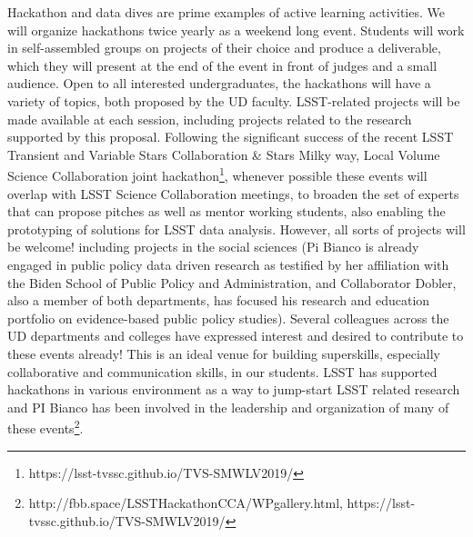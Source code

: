 Hackathon and data dives are prime examples of active learning activities.  We will organize hackathons twice yearly as a weekend long event.  Students will work in self-assembled groups on projects of their choice and produce a deliverable, which they will present at the end of the event in front of judges and a small audience.  Open to all interested undergraduates, the hackathons will have a variety of topics, both proposed by the UD faculty. LSST-related projects will be made available at each session, including projects related to the research supported by this proposal. Following the significant success of the recent LSST Transient and Variable Stars Collaboration & Stars Milky way, Local Volume Science Collaboration joint hackathon\footnote{https://lsst-tvssc.github.io/TVS-SMWLV2019/}, whenever possible these events will overlap with LSST Science Collaboration meetings, to broaden the set of experts that can propose pitches as well as mentor working students, also enabling the prototyping of solutions for LSST data analysis. However, all sorts of projects will be welcome! including projects in the social sciences (Pi Bianco is already engaged in public policy data driven research as testified by her affiliation with the Biden School of Public Policy and Administration, and Collaborator Dobler, also a member of both departments, has focused his research and education portfolio on evidence-based public policy studies).  Several colleagues across the UD departments and colleges have expressed interest and desired to contribute to these events already! This is an ideal venue for building superskills, especially collaborative and communication skills, in our students. LSST has supported hackathons in various environment as a way to jump-start LSST related research and PI Bianco has been involved in the leadership and organization of many of these events\footnote{http://fbb.space/LSSTHackathonCCA/WPgallery.html, https://lsst-tvssc.github.io/TVS-SMWLV2019/}.

